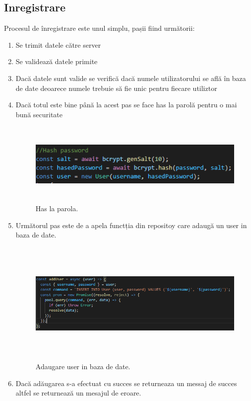 \subsection{Inregistrare}
\par Procesul de înregistrare este unul simplu, pașii fiind următorii:
\begin{enumerate}
  	\item Se trimit datele către server
	\item Se validează datele primite	
	\item Dacă datele sunt valide se verifică dacă numele utilizatorului se află în baza de date deoarece numele trebuie să fie unic pentru fiecare utiliztor
	\item Dacă totul este bine până la acest pas se face has la parolă pentru o mai bună securitate
		\begin{figure}[htbp]
			\centerline{\includegraphics[width=15cm, height=4cm]{figures/hasparola.png}}
			\caption{Has la parola.}
			\label{fig}
		\end{figure}
	\item Următorul pas este de a apela functția din repositoy care adaugă un user in baza de date.
		\begin{figure}[htbp]
			\centerline{\includegraphics[width=19cm, height=6cm]{figures/adaugare user.png}}
			\caption{Adaugare user in baza de date.}
			\label{fig}
		\end{figure}	
	\item Dacă adăugarea s-a efectuat cu succes se returneaza un messaj de succes altfel se returnează un mesajul de eroare.
\end{enumerate}

